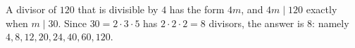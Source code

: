 A divisor of $120$ that is divisible by $4$ has the form $4m$, and $4m\mid120$ exactly when $m\mid30$. Since $30=2\cdot3\cdot5$ has $2\cdot2\cdot2=8$ divisors, the answer is $\boxed{8}$: namely $4,8,12,20,24,40,60,120$.
